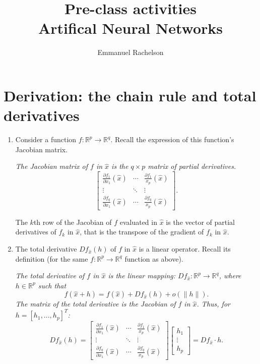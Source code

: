 \documentclass{article}
\author{Emmanuel Rachelson}
\title{Pre-class activities\\Artifical Neural Networks}
\date{}
\newcommand{\R}{\ensuremath{\mathbb{R}}}
\begin{document}
\maketitle

\section{Derivation: the chain rule and total derivatives}

\begin{enumerate}
	\item Consider a function $f:\R^p\rightarrow \R^q$. Recall the expression of this function's Jacobian matrix.
	
	{\it The Jacobian matrix of $f$ in $\hat{x}$ is the $q\times p$ matrix of partial derivatives.
	$$\left[\begin{array}{ccc}
	\frac{\partial f_1}{\partial x_1}(\hat{x}) & \cdots & \frac{\partial f_1}{x_p}(\hat{x})\\
	\vdots & \ddots & \vdots \\
	\frac{\partial f_q}{\partial x_1}(\hat{x}) & \cdots & \frac{\partial f_q}{x_p}(\hat{x})
	\end{array}\right].$$
	
	The $k$th row of the Jacobian of $f$ evaluated in $\hat{x}$ is the vector of partial derivatives of $f_k$ in $\hat{x}$, that is the transpose of the gradient of $f_k$ in $\hat{x}$.
	}
	
	\item The total derivative $Df_{\hat{x}}(h)$ of $f$ in $\hat{x}$ is a linear operator. Recall its definition (for the same $f:\R^p\rightarrow \R^q$ function as above).
	
	{\it The total derivative of $f$ in $\hat{x}$ is the linear mapping: $Df_{\hat{x}}:\R^p\rightarrow\R^q$, where $h \in \R^p$ such that
	$$f(\hat{x}+h) = f(\hat{x}) + Df_{\hat{x}}(h) + o(\|h\|).$$
	The matrix of the total derivative is the Jacobian of $f$ in $\hat{x}$. Thus, for $h = \left[h_1,\ldots,h_p\right]^T$:
	$$Df_{\hat{x}}(h) = \left[\begin{array}{ccc}
	\frac{\partial f_1}{\partial x_1}(\hat{x}) & \cdots & \frac{\partial f_1}{x_p}(\hat{x})\\
	\vdots & \ddots & \vdots \\
	\frac{\partial f_q}{\partial x_1}(\hat{x}) & \cdots & \frac{\partial f_q}{x_p}(\hat{x})
	\end{array}\right] \left[\begin{array}{c}
	h_1\\ \vdots\\ h_p
	\end{array}\right] = Df_{\hat{x}} \cdot h.$$
	}
	

\end{enumerate}
\end{document}
